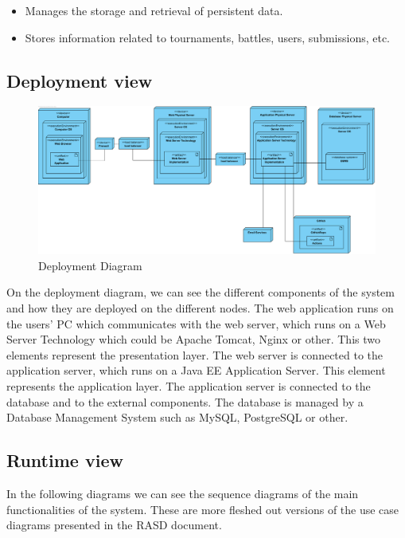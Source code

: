 \documentclass{article}
\begin{document}
\begin{itemize}
    \item Manages the storage and retrieval of persistent data.
    \item Stores information related to tournaments, battles, users, submissions, etc.
\end{itemize}


\subsection{Deployment view}

\begin{figure}[H]
    \centering
    \includegraphics[width=1\textwidth]{images/DeploymentDiagram.png}
    \caption{Deployment Diagram}
    \label{fig:DeploymentDiagram}
\end{figure}

On the deployment diagram, we can see the different components of the system and how they are 
deployed on the different nodes. The web application runs on the users' PC which communicates with the
web server, which runs on a Web Server Technology which could be Apache Tomcat, Nginx or other. This two 
elements represent the presentation layer.
The web server is connected to the application server, which runs on a Java EE Application Server. This
element represents the application layer. The application server is connected to the database and to 
the external components. The database is managed by a Database Management System such as MySQL, PostgreSQL or other. 

\newpage

\subsection{Runtime view}

In the following diagrams we can see the sequence diagrams of the main functionalities of the system.
These are more fleshed out versions of the use case diagrams presented in the RASD document.
\end{document}
